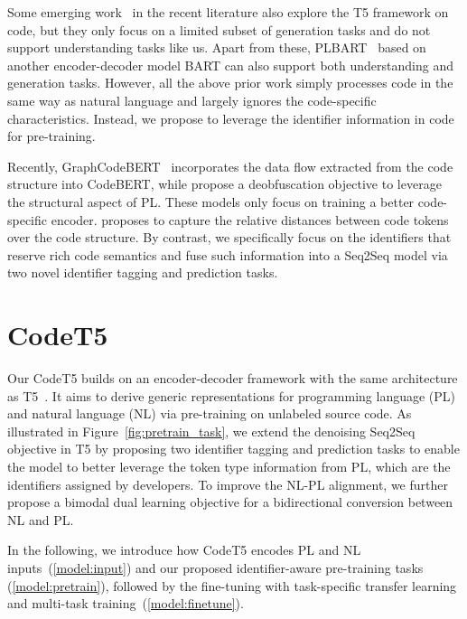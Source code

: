 \documentclass[11pt]{article}
\begin{document}
Some emerging work~\cite{DBLP:conf/emnlp/ClementDTSS20,DBLP:conf/icse/MastropaoloSCNP21,DBLP:journals/corr/abs-2104-02443} in  the recent literature also  explore the T5 framework on code, but they only focus on a limited subset of generation tasks and do not support understanding tasks like us.
Apart from these, 
PLBART~\cite{DBLP:journals/corr/abs-2103-06333} based on another encoder-decoder model BART  can also  support both understanding and generation tasks. However, all the above prior work simply processes code in the same way as natural language and largely ignores the code-specific characteristics.
Instead, we propose to leverage the  identifier information in code for pre-training.


Recently,  GraphCodeBERT~\cite{DBLP:journals/corr/abs-2009-08366} incorporates the  data flow extracted from the code structure into CodeBERT,  while \citet{DBLP:journals/corr/abs-2102-07492} propose a deobfuscation objective to leverage the structural aspect of PL. These models only focus on training a better code-specific encoder. 
\citet{DBLP:conf/iclr/ZugnerKCLG21} proposes to capture the relative distances between code tokens over the code structure.
By contrast, we specifically focus on the identifiers that reserve rich code semantics and fuse such information into a Seq2Seq model via two novel identifier tagging and prediction tasks.
 \section{CodeT5}

Our CodeT5 builds on an encoder-decoder framework with the same architecture as T5~\cite{DBLP:journals/jmlr/RaffelSRLNMZLL20}.
It aims to derive generic representations for programming language (PL) and natural language (NL)  via pre-training on unlabeled source code.
As illustrated in Figure~\ref{fig:pretrain_task},
we extend the denoising  Seq2Seq objective in T5 by proposing two 
identifier tagging and prediction tasks to enable the model to better leverage the  token type information from PL, which are the identifiers assigned by developers.
To improve the NL-PL alignment, we further propose a bimodal dual learning objective for a bidirectional conversion between NL and PL.


In the following, we introduce how CodeT5 encodes PL and NL inputs~(\cref{model:input}) and our proposed identifier-aware pre-training tasks (\cref{model:pretrain}), followed by the fine-tuning with task-specific transfer learning and multi-task training~(\cref{model:finetune}).
\end{document}
